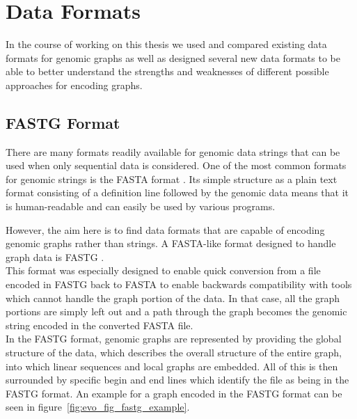 \documentclass[a4paper,12pt,twoside,BCOR=10mm]{scrbook}
\begin{document}
\section{Data Formats}
\label{sec:methods_data_formats}
%

In the course of working on this thesis we used and compared existing data 
formats for genomic graphs as well as designed several new data formats 
to be able to better understand the strengths and weaknesses of 
different possible approaches for encoding graphs.

\subsection{FASTG Format}

There are many formats readily available for genomic data strings 
that can be used when only sequential data is considered. 
One of the most common formats for genomic strings is the FASTA format \citep{Childs2007}. 
Its simple structure as a plain text format consisting of a definition line 
followed by the genomic data means that it is human-readable 
and can easily be used by various programs.

However, the aim here is to find data formats that are capable of 
encoding genomic graphs rather than strings. 
A FASTA-like format designed to handle graph data is FASTG \citep{specFASTG}. \\
This format was especially designed to enable quick conversion from a file 
encoded in FASTG back to FASTA to enable backwards compatibility with tools which cannot 
handle the graph portion of the data. In that case, all the graph portions are simply left 
out and a path through the graph becomes the genomic string encoded in the converted FASTA file. \\
In the FASTG format, genomic graphs are represented by providing the global structure of 
the data, which describes the overall structure of the entire graph, 
into which linear sequences and local graphs are embedded. 
All of this is then surrounded by specific begin and end lines which identify the file as being 
in the FASTG format. 
An example for a graph encoded in the FASTG format can be seen in figure~\ref{fig:evo_fig_fastg_example}.
\end{document}
